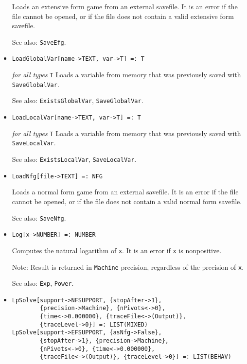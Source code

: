 \begin{itemize}
\bd
Loads an extensive form game from an external savefile.
It is an error if the file cannot be opened, or if the file does
not contain a valid extensive form savefile.
\item [See also:] \verb+SaveEfg+.
\ed

\item{}
\protect \large \begin{verbatim}
LoadGlobalVar[name->TEXT, var->T] =: T
\end{verbatim}\normalsize

{\it for all types} {\tt T}
\bd
Loads a variable from memory that was previously saved with 
\verb+SaveGlobalVar+. 
\item [See also:] \verb+ExistsGlobalVar+, \verb+SaveGlobalVar+.
\ed

\item{}
\protect \large \begin{verbatim}
LoadLocalVar[name->TEXT, var->T] =: T
\end{verbatim}\normalsize

{\it for all types} {\tt T}
\bd
Loads a variable from memory that was previously saved with 
\verb+SaveLocalVar+. 
\item [See also:] \verb+ExistsLocalVar+, \verb+SaveLocalVar+.
\ed

\item{}
\protect \large \begin{verbatim}
LoadNfg[file->TEXT] =: NFG 
\end{verbatim}\normalsize

\bd
Loads a normal form game from an external savefile.
It is an error if the file cannot be opened, or if the file does not 
contain a valid normal form savefile.
\item [See also:] \verb+SaveNfg+.
\ed

\item{}
\protect \large \begin{verbatim}
Log[x->NUMBER] =: NUMBER 
\end{verbatim} \normalsize

\bd
Computes the natural logarithm of \verb+x+.  It is an error if
\verb+x+ is nonpositive.
\item [Note:] Result is returned in \verb+Machine+ precision, regardless of
the precision of \verb+x+.
\item [See also:] \verb+Exp+, \verb+Power+.
\ed

\item{}
\protect \large \begin{verbatim}
LpSolve[support->NFSUPPORT, {stopAfter->1}, 
        {precision->Machine}, {nPivots<->0}, 
        {time<->0.000000}, {traceFile<->(Output)}, 
        {traceLevel->0}] =: LIST(MIXED) 
LpSolve[support->EFSUPPORT, {asNfg->False}, 
        {stopAfter->1}, {precision->Machine}, 
        {nPivots<->0}, {time<->0.000000}, 
        {traceFile<->(Output)}, {traceLevel->0}] =: LIST(BEHAV) 
\end{verbatim}\normalsize


\end{itemize}
